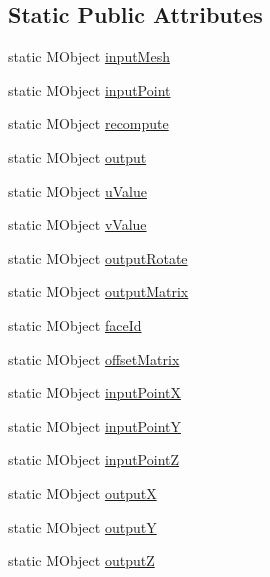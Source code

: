 \subsection*{Static Public Attributes}
\begin{DoxyCompactItemize}
\item 
static M\-Object \hyperlink{class_m_g__poly_rivet_a7ab1746e551e796af0a8ded100097d23}{input\-Mesh}
\item 
static M\-Object \hyperlink{class_m_g__poly_rivet_af237dc390876f88e7577aa83457e7ce2}{input\-Point}
\item 
static M\-Object \hyperlink{class_m_g__poly_rivet_af74d6fe431dadcc1806a072cf97fba97}{recompute}
\item 
static M\-Object \hyperlink{class_m_g__poly_rivet_a3e4254e0cca1ba2be5fcbac82c9c5c12}{output}
\item 
static M\-Object \hyperlink{class_m_g__poly_rivet_a04be4b6c8cf58fe4b45bc20edbd52d38}{u\-Value}
\item 
static M\-Object \hyperlink{class_m_g__poly_rivet_aec3670f4f9a06480753efc8006076603}{v\-Value}
\item 
static M\-Object \hyperlink{class_m_g__poly_rivet_a258f5cda9a54d7c22b45c70c17852ffc}{output\-Rotate}
\item 
static M\-Object \hyperlink{class_m_g__poly_rivet_a66a9ea9bb7e75ba0c7bc1644dbbc481d}{output\-Matrix}
\item 
static M\-Object \hyperlink{class_m_g__poly_rivet_addab0e7cdd6ba7d9580198f19f66dbd0}{face\-Id}
\item 
static M\-Object \hyperlink{class_m_g__poly_rivet_a40686ba1ddd87b87272592bcbff78116}{offset\-Matrix}
\item 
static M\-Object \hyperlink{class_m_g__poly_rivet_a08e43c9e982462593cd8f161f7077f1c}{input\-Point\-X}
\item 
static M\-Object \hyperlink{class_m_g__poly_rivet_a2adde2d1b24113e0674eff68ac098cd5}{input\-Point\-Y}
\item 
static M\-Object \hyperlink{class_m_g__poly_rivet_ac16ba069fedb3f1e0b6991ab7f43891a}{input\-Point\-Z}
\item 
static M\-Object \hyperlink{class_m_g__poly_rivet_a71d0569c9b053861347de918d5c46b7b}{output\-X}
\item 
static M\-Object \hyperlink{class_m_g__poly_rivet_ab2fd560a86a5f12368660997fc166254}{output\-Y}
\item 
static M\-Object \hyperlink{class_m_g__poly_rivet_a7c80d2819ac2a76ca9feb872c4e3598d}{output\-Z}
\item 

\end{DoxyCompactItemize}
